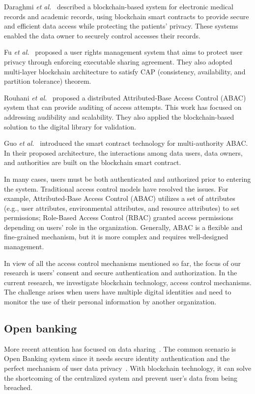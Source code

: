 Daraghmi \emph{et al.}~\cite{daraghmi2019medchain,daraghmi2019unichain} described a blockchain-based system for electronic medical records and academic records, using blockchain smart contracts to provide secure and efficient data access while protecting the patients' privacy. These systems enabled the data owner to securely control accesses their records.\par

Fu \emph{et al.}~\cite{fu2020soteria} proposed a user rights management system that aims to protect user privacy through enforcing executable sharing agreement. They also adopted multi-layer blockchain architecture to satisfy CAP (consistency, availability, and partition tolerance) theorem.\par

Rouhani \emph{et al.}~\cite{rouhani2020distributed} proposed a distributed Attributed-Base Access Control (ABAC) system that can provide auditing of access attempts. This work has focused on addressing audibility and scalability. They also applied the blockchain-based solution to the digital library for validation.\par

Guo \emph{et al.}~\cite{guo2019multi} introduced the smart contract technology for multi-authority ABAC. In their proposed architecture, the interactions among data users, data owners, and authorities are built on the blockchain smart contract.\par

In many cases, users must be both authenticated and authorized prior to entering the system. Traditional access control models have resolved the issues. For example, Attributed-Base Access Control (ABAC) utilizes a set of attributes (e.g., user attributes, environmental attributes, and resource attributes) to set permissions; Role-Based Access Control (RBAC) granted access permissions depending on users' role in the organization. Generally, ABAC is a flexible and fine-grained mechanism, but it is more complex and requires well-designed management.\par

In view of all the access control mechanisms mentioned so far, the focus of our research is users' consent and secure authentication and authorization. In the current research, we investigate blockchain technology, access control mechanisms. The challenge arises when users have multiple digital identities and need to monitor the use of their personal information by another organization.\par

\subsection{Open banking}
More recent attention has focused on data sharing~\cite{xu2020ppm,zhang2019obbc}. The common scenario is Open Banking system since it needs secure identity authentication and the perfect mechanism of user data privacy~\cite{wang2020blockchain}. With blockchain technology, it can solve the shortcoming of the centralized system and prevent user's data from being breached.